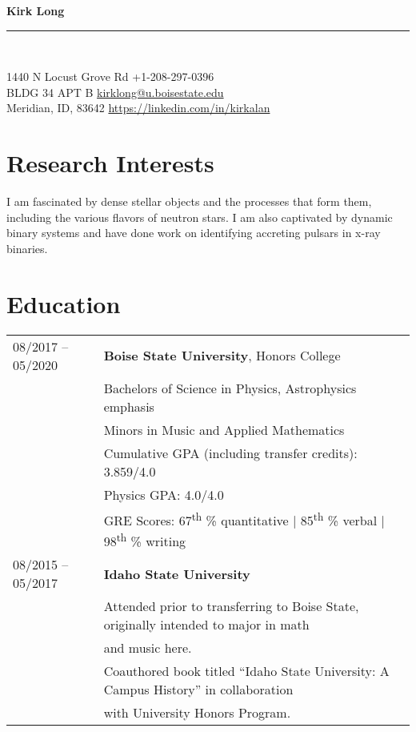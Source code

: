 \documentclass[11pt]{article}
\newcommand{\makeheading}[2]%
        {\begin{minipage}[t]{\textwidth}%
                 {\LARGE \bfseries #1} \\[-0.3\baselineskip]%
                 \rule{\columnwidth}{1.5pt}\\[0.1\baselineskip]
         \end{minipage}}
\begin{document}
\makeheading{Kirk Long}{}

1440 N Locust Grove Rd				\hfill	+1-208-297-0396\\
BLDG 34 APT B	\hfill	\href{mailto:kirklong@u.boisestate.edu}{kirklong@u.boisestate.edu}\\
Meridian, ID, 83642			\hfill	\url{https://linkedin.com/in/kirkalan}



\section{Research Interests}
 I am fascinated by dense stellar objects and the processes that form them, including the various flavors of neutron stars. I am also captivated by dynamic binary systems and have done work on identifying accreting pulsars in x-ray binaries.

\section{Education}
\begin{tabular}{ll}
08/2017 -- 05/2020	& 	\textbf{Boise State University}, Honors College \vspace{1mm} \\
			&	Bachelors of Science in Physics, Astrophysics emphasis\\
			&	Minors in Music and Applied Mathematics\vspace{1mm} \\
			&	Cumulative GPA (including transfer credits): 3.859/4.0\\
      & Physics GPA: 4.0/4.0\\
      & GRE Scores: 67\textsuperscript{th} \% quantitative | 85\textsuperscript{th} \% verbal | 98\textsuperscript{th} \% writing \vspace{2mm} \\
08/2015 -- 05/2017 & \textbf{Idaho State University} \vspace{1mm} \\
      & Attended prior to transferring to Boise State, originally intended to major in math\\
      & and music here.\\
      & Coauthored book titled ``Idaho State University: A Campus History'' in collaboration\\
      & with University Honors Program.\\

\end{tabular}
\end{document}
